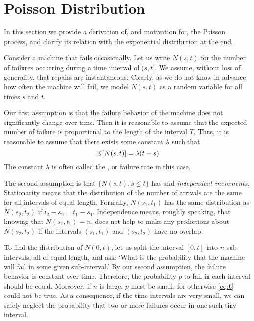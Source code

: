 \section{Poisson Distribution}
\label{sec:poisson-distribution}

In this section we provide a derivation of, and motivation for, the
Poisson process, and clarify its relation with the exponential
distribution at the end.

Consider a machine that fails occasionally. Let us write $N(s, t)$ for
the number of failures occurring during a time interval of $(s,t]$. We
assume, without loss of generality, that repairs are
instantaneous. Clearly, as we do not know in advance how often the
machine will fail, we model $N(s,t)$ as a random variable for all
times $s$ and $t$.

Our first assumption is that the failure behavior of the machine does not
significantly change over time. Then it is reasonable to assume that
the expected number of failure is proportional to the  length of
the interval $T$. Thus, it is reasonable to assume that there exists some
constant $\lambda$ such that
\begin{equation}
  \label{eq:6}
 \,\mathbb{E}\left[N(s,t)\right] = \lambda (t-s)
\end{equation}
The constant $\lambda$ is often called the , or
failure rate in this case.


The second assumption is that $\{N(s,t), s\leq t\}$ has
 and \emph{independent increments}. Stationarity
means that the distribution of the number of arrivals are the same for
all intervals of equal length. Formally, $N(s_1,t_1)$ has the same
distribution as $N(s_2, t_2)$ if $t_2-s_2 = t_1-s_1$. Independence
means, roughly speaking, that knowing that $N(s_1,t_1)= n$, does not
help to make any predictions about $N(s_2, t_2)$ if the intervals
$(s_1,t_1)$ and $(s_2, t_2)$ have no overlap.

To find the distribution of $N(0,t)$, let us split the interval
$[0,t]$ into $n$ sub-intervals, all of equal length, and ask: `What is
the probability that the machine will fail in some given
sub-interval.'  By our second assumption, the failure behavior is
constant over time. Therefore, the probability $p$ to fail in each
interval should be equal. Moreover, if $n$ is large, $p$ must be
small, for otherwise \eqref{eq:6} could not be true. As a consequence,
if the time intervals are very small, we can safely neglect the
probability that two or more failures occur in one such tiny interval.

